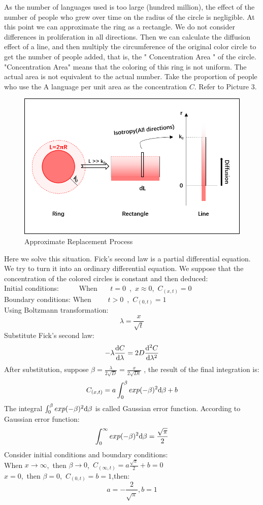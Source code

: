 \documentclass{mcmthesis}
\begin{document}
    As the number of languages used is too large (hundred million),
    the effect of the number of people who grew over time on the radius of the circle is negligible.
    At this point we can approximate the ring as a rectangle.
    We do not consider differences in proliferation in all directions.
    Then we can calculate the diffusion effect of a line,
    and then multiply the circumference of the original color circle
    to get the number of people added, that is, the " Concentration Area " of the circle.
    "Concentration Area" means that the coloring of this ring is not uniform.
    The actual area is not equivalent to the actual number.
    Take the proportion of people who use the A language per unit area as the concentration $C$.
    Refer to Picture 3.

    \begin{figure}[h]
          \centering
          \includegraphics{p3.png}
          \caption{Approximate Replacement Process}
          \label{p3}
        \end{figure}

    Here we solve this situation.
    Fick's second law is a partial differential equation.
    We try to turn it into an ordinary differential equation.
    We suppose that the concentration of the colored circles is constant and then deduced:
    \\Initial conditions: \ \ \ \ \  When \ \ \ $t=0$\ ,\ $x\approx 0$,\ $C_{(x,t)}=0$
    \\Boundary conditions: When \ \ \ \ $t>0$\ ,\ $C_{(0,t)}=1$%
    \\Using Boltzmann transformation:
    $$\lambda=\frac{x}{\sqrt{t}}$$
    Substitute Fick's second law:
    $$-\lambda\frac{{\rm d}C}{{\rm d}\lambda}=2D\frac{{\rm d}^2C}{{\rm d}\lambda^2}$$
    After substitution, suppose $\beta=\frac{\lambda}{2\sqrt{D}}=\frac{x}{2\sqrt{Dt}}$ ,
    the result of the final integration is:
    $$C_{(x,t)}=a\int_0^\beta exp(-\beta)^2{\rm d}\beta+b$$
    The integral $\int_0^\beta exp(-\beta)^2{\rm d}\beta$ is called Gaussian error function.
    According to Gaussian error function:
    $$\int_0^\infty exp(-\beta)^2{\rm d}\beta=\frac{\sqrt{\pi}}{2}$$
    Consider initial conditions and boundary conditions:
    \\When $x\rightarrow\infty$,\ then $\beta\rightarrow 0$,\ $C_{(\infty,t)}=a\frac{\sqrt{\pi}}{2}+b=0$
    \\$x=0$,\ then $\beta=0$,\ $C_{(0,t)}=b=1$,then:
    $$a=-\frac{2}{\sqrt{\pi}},b=1$$
\end{document}

